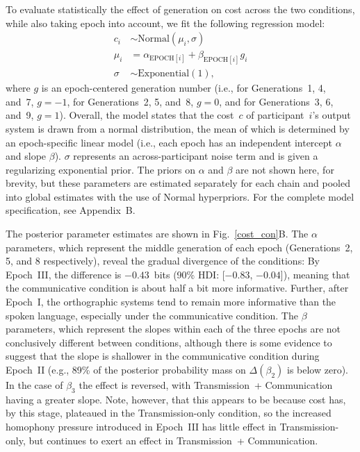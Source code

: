 \documentclass[doc,biblatex]{apa7}
\begin{document}
To evaluate statistically the effect of generation on cost across the two conditions, while also taking epoch into account, we fit the following regression model:
	\begin{equation}
	\begin{aligned}
	   c_i & \sim \mathrm{Normal}(\mu_i, \sigma) \\
	 \mu_i & =    \alpha_{\mathrm{EPOCH}[i]} + \beta_{\mathrm{EPOCH}[i]} g_i \\
	\sigma & \sim \mathrm{Exponential}(1),
	\end{aligned}
	\end{equation}
where $g$ is an epoch-centered generation number (i.e., for Generations~1, 4, and~7, $g=-1$, for Generations~2, 5, and~8, $g=0$, and for Generations~3, 6, and~9, $g=1$). Overall, the model states that the cost~$c$ of participant~$i$'s output system is drawn from a normal distribution, the mean of which is determined by an epoch-specific linear model (i.e., each epoch has an independent intercept $\alpha$ and slope $\beta$). $\sigma$ represents an across-participant noise term and is given a regularizing exponential prior. The priors on $\alpha$ and $\beta$ are not shown here, for brevity, but these parameters are estimated separately for each chain and pooled into global estimates with the use of Normal hyperpriors. For the complete model specification, see Appendix~B.

The posterior parameter estimates are shown in Fig.~\ref{cost_con}B. The $\alpha$ parameters, which represent the middle generation of each epoch (Generations~2, 5, and 8 respectively), reveal the gradual divergence of the conditions: By Epoch~III, the difference is $-0.43$~bits (90\% HDI: [$-0.83$, $-0.04$]), meaning that the communicative condition is about half a bit more informative. Further, after Epoch~I, the orthographic systems tend to remain more informative than the spoken language, especially under the communicative condition. The $\beta$ parameters, which represent the slopes within each of the three epochs are not conclusively different between conditions, although there is some evidence to suggest that the slope is shallower in the communicative condition during Epoch~II (e.g., 89\% of the posterior probability mass on $\Delta(\beta_2)$ is below zero). In the case of $\beta_3$ the effect is reversed, with Transmission~+ Communication having a greater slope. Note, however, that this appears to be because cost has, by this stage, plateaued in the Transmission-only condition, so the increased homophony pressure introduced in Epoch~III has little effect in Transmission-only, but continues to exert an effect in Transmission~+ Communication.
\end{document}
